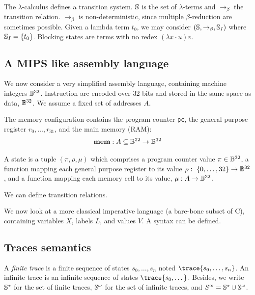 \documentclass[toc]{../cs-classes/cs-classes}
\begin{document}
\begin{definition}
\end{definition}

The $\lambda$-calculus defines a transition system. $\S$ is the set of $\lambda$-terms and $\to_\beta$ the transition relation. $\to_\beta$ is non-deterministic, since multiple $\beta$-reduction are sometimes possible. Given a lambda term $t_0$, we may consider $(\S, \to_\beta, \S_I)$ where $\S_I = \{t_0\}$. Blocking states are terms with no redex $(\lambda x \cdot u)v$.

\subsection{A MIPS like assembly language}
We now consider a very simplified assembly language, containing machine integers $\B^{32}$. Instruction are encoded over 32 bits and stored in the same space as data, $\B^{32}$. We assume a fixed set of addresses $A$.

The memory configuration contains the program counter \texttt{pc}, the general purpose register $r_0, \dots, r_{31}$, and the main memory (RAM):
\begin{equation*}
    \mathbf{mem}:A\subseteq\B^{32}\to\B^{32}
\end{equation*}

\begin{definition}[State]
    A state is a tuple $(\pi, \rho, \mu)$ which comprises a program counter value $\pi\in\B^{32}$, a function mapping each general purpose register to its value $\rho : \{0, \dots, 32\} \to \B^{32}$, and a function mapping each memory cell to its value, $\mu:A\to\B^{32}$.
\end{definition}
We can define transition relations.

We now look at a more classical imperative language (a bare-bone subset of C), containing variables $X$, labels $L$, and values $V$. A syntax can be defined.

\subsection{Traces semantics}
\begin{definition}[Traces]
    A \emph{finite trace} is a finite sequence of states $s_0, \dots, s_n$ noted $\trace{s_0, \dots, s_n}$. An infinite trace is an infinite sequence of states $\trace{s_0, \dots}$. Besides, we write $\S^\star$ for the set of finite traces, $\S^\omega$ for the set of infinite traces, and $S^\propto=\S^\star\cup\S^\omega$.
\end{definition}
\end{document}
